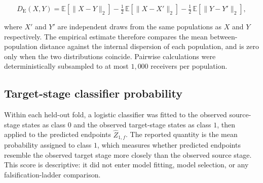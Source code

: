 \begin{equation}
D_{\mathrm{E}}(X,Y)
=
\mathbb{E}\!\left[\lVert X-Y \rVert_2\right]
-
\tfrac{1}{2}\,\mathbb{E}\!\left[\lVert X-X' \rVert_2\right]
-
\tfrac{1}{2}\,\mathbb{E}\!\left[\lVert Y-Y' \rVert_2\right],
\label{eq:app-b-energy-distance}
\end{equation}

where $X'$ and $Y'$ are independent draws from the same populations as $X$ and
$Y$ respectively. The empirical estimate therefore compares the mean
between-population distance against the internal dispersion of each population,
and is zero only when the two distributions coincide. Pairwise calculations were
deterministically subsampled to at most $1{,}000$ receivers per population.

\subsection*{Target-stage classifier probability}

Within each held-out fold, a logistic classifier was fitted to the observed
source-stage states as class $0$ and the observed target-stage states as class
$1$, then applied to the predicted endpoints $\widehat{Z}_{1,f}$. The reported
quantity is the mean probability assigned to class $1$, which measures whether
predicted endpoints resemble the observed target stage more closely than the
observed source stage. This score is descriptive: it did not enter model
fitting, model selection, or any falsification-ladder comparison.
